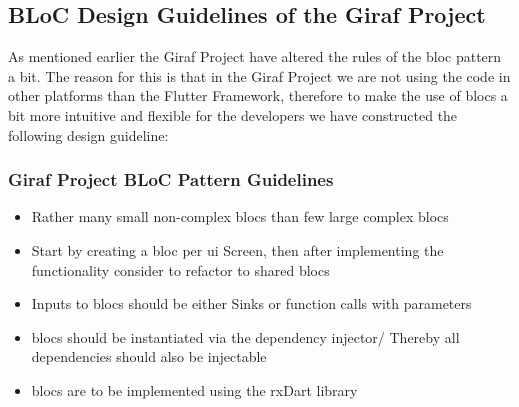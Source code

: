 \subsection{BLoC Design Guidelines of the Giraf Project}
As mentioned earlier the Giraf Project have altered the rules of the \gls{bloc} pattern a bit. The reason for this is that in the Giraf Project we are not using the code in other platforms than the Flutter Framework, therefore to make the use of \glspl{bloc} a bit more intuitive and flexible for the developers we have constructed the following design guideline:

\subsubsection{Giraf Project BLoC Pattern Guidelines}
\begin{itemize}
  \item Rather many small non-complex \glspl{bloc} than few large complex \glspl{bloc}
  \item Start by creating a \gls{bloc} per \gls{ui} Screen, then after implementing the functionality consider to refactor to shared \glspl{bloc}
  \item Inputs to \glspl{bloc} should be either Sinks or function calls with parameters
  \item \glspl{bloc} should be instantiated via the dependency injector/ Thereby all dependencies should also be injectable
  \item \glspl{bloc} are to be implemented using the rxDart library
\end{itemize}


